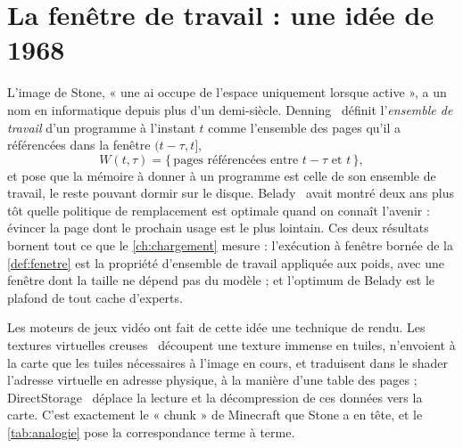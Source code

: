 \section{La fenêtre de travail : une idée de 1968}\label{sec:etat-fenetre}

L'image de Stone, « une ai occupe de l'espace uniquement lorsque active », a un nom en informatique depuis plus d'un demi-siècle. Denning~\cite{denning1968workingset} définit l'\emph{ensemble de travail} d'un programme à l'instant $t$ comme l'ensemble des pages qu'il a référencées dans la fenêtre $(t - \tau, t]$,
\[
W(t, \tau) = \{\, \text{pages référencées entre } t - \tau \text{ et } t \,\},
\]
et pose que la mémoire à donner à un programme est celle de son ensemble de travail, le reste pouvant dormir sur le disque. Belady~\cite{belady1966} avait montré deux ans plus tôt quelle politique de remplacement est optimale quand on connaît l'avenir : évincer la page dont le prochain usage est le plus lointain. Ces deux résultats bornent tout ce que le \cref{ch:chargement} mesure : l'exécution à fenêtre bornée de la \cref{def:fenetre} est la propriété d'ensemble de travail appliquée aux poids, avec une fenêtre dont la taille ne dépend pas du modèle ; et l'optimum de Belady est le plafond de tout cache d'experts.

Les moteurs de jeux vidéo ont fait de cette idée une technique de rendu. Les textures virtuelles creuses~\cite{barrett2008svt} découpent une texture immense en tuiles, n'envoient à la carte que les tuiles nécessaires à l'image en cours, et traduisent dans le shader l'adresse virtuelle en adresse physique, à la manière d'une table des pages ; DirectStorage~\cite{directstorage14} déplace la lecture et la décompression de ces données vers la carte. C'est exactement le « chunk » de Minecraft que Stone a en tête, et le \cref{tab:analogie} pose la correspondance terme à terme.


